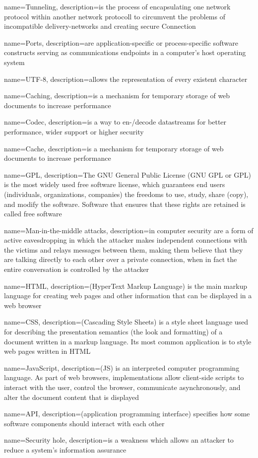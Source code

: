 {
  name=Tunneling,
  description={is the process of encapsulating one network protocol within another network protocoll to circumvent the problems of incompatible delivery-networks and creating secure Connection}
}

{
  name=Ports,
  description={are application-specific or process-specific software constructs serving as communications endpoints in a computer's host operating system}
}

{
  name=UTF-8,
  description={allows the representation of every existent character}
}

{
  name=Caching,
  description={is a mechanism for temporary storage of web documents to increase performance}
}

{
  name=Codec,
  description={is a way to en-/decode datastreams for better performance, wider support or higher security}
}

{
  name=Cache,
  description={is a mechanism for temporary storage of web documents to increase performance}
}

{
  name=GPL,
  description={The GNU General Public License (GNU GPL or GPL) is the most widely used free software license, which guarantees end users (individuals, organizations, companies) the freedoms to use, study, share (copy), and modify the software. Software that ensures that these rights are retained is called free software}
}

{
  name=Man-in-the-middle attacks,
  description={in computer security are a form of active eavesdropping in which the attacker makes independent connections with the victims and relays messages between them, making them believe that they are talking directly to each other over a private connection, when in fact the entire conversation is controlled by the attacker}
}

{
  name=HTML,
  description={(HyperText Markup Language) is the main markup language for creating web pages and other information that can be displayed in a web browser}
}

{
  name=CSS,
  description={(Cascading Style Sheets) is a style sheet language used for describing the presentation semantics (the look and formatting) of a document written in a markup language. Its most common application is to style web pages written in HTML}
}

{
  name=JavaScript,
  description={(JS) is an interpreted computer programming language. As part of web browsers, implementations allow client-side scripts to interact with the user, control the browser, communicate asynchronously, and alter the document content that is displayed}
}

{
  name=API,
  description={(application programming interface) specifies how some software components should interact with each other}
}

{
  name=Security hole,
  description={is a weakness which allows an attacker to reduce a system's information assurance}
}
